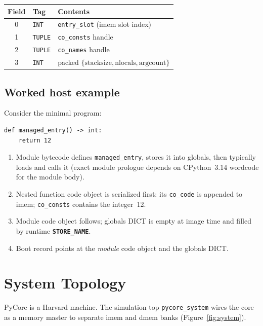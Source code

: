 \documentclass[11pt,a4paper]{article}
\newcommand{\opcode}[1]{\texttt{\textbf{#1}}}
\newcommand{\tagname}[1]{\texttt{#1}}
\newcommand{\modname}[1]{\texttt{#1}}
\begin{document}
\begin{center}
\begin{tabular}{@{}cll@{}}
\toprule
\textbf{Field} & \textbf{Tag} & \textbf{Contents} \\
\midrule
0 & \tagname{INT} & \texttt{entry\_slot} (imem slot index) \\
1 & \tagname{TUPLE} & \texttt{co\_consts} handle \\
2 & \tagname{TUPLE} & \texttt{co\_names} handle \\
3 & \tagname{INT} & packed $\{\mathrm{stacksize},\mathrm{nlocals},\mathrm{argcount}\}$ \\
\bottomrule
\end{tabular}
\end{center}

\subsection{Worked host example}

Consider the minimal program:

\begin{lstlisting}[style=python,caption={pycore/programs/smoke\_return.py}]
def managed_entry() -> int:
    return 12
\end{lstlisting}

\begin{enumerate}[leftmargin=*]
  \item Module bytecode defines \texttt{managed\_entry}, stores it into globals,
        then typically loads and calls it (exact module prologue depends on
        CPython~3.14 wordcode for the module body).
  \item Nested function code object is serialized first: its \texttt{co\_code}
        is appended to imem; \texttt{co\_consts} contains the integer~12.
  \item Module code object follows; globals DICT is empty at image time and
        filled by runtime \opcode{STORE\_NAME}.
  \item Boot record points at the \emph{module} code object and the globals
        DICT.
\end{enumerate}

\section{System Topology}
\label{sec:system}

PyCore is a Harvard machine. The simulation top
\modname{pycore\_system} wires the core as a memory master to separate imem
and dmem banks (Figure~\ref{fig:system}).
\end{document}
